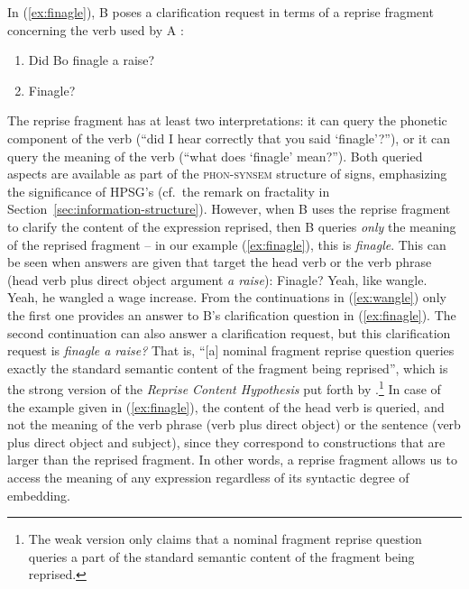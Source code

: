 \documentclass[output=paper,biblatex,babelshorthands,newtxmath,draftmode,colorlinks,citecolor=brown]{langscibook}
\begin{document}
In (\ref{ex:finagle}), B poses a clarification request in terms of a reprise fragment concerning the verb used by A \citep[]{Ginzburg:2012}:
%
\ea \label{ex:finagle}
\begin{enumerate}[noitemsep]
\item {} Did Bo finagle a raise?
\item {} Finagle?
\end{enumerate}
\z

\noindent
The reprise fragment has at least two interpretations: it can query the phonetic component of the verb (\enquote{did I hear correctly that you said \enquote{finagle}?}), or it can query the meaning of the verb (\enquote{what does \enquote{finagle} mean?}).
%
Both queried aspects are available as part of the \textsc{phon-synsem} structure of signs, emphasizing the significance of HPSG's  (cf.\ the remark on fractality in Section~\ref{sec:information-structure}).
%
However, when B uses the reprise fragment to clarify the content of the expression reprised, then B queries \emph{only} the meaning of the reprised fragment \citep{Purver:Ginzburg:2004,Ginzburg:Purver:2012} -- in our example (\ref{ex:finagle}), this is \textit{finagle}.
%
This can be seen when answers are given that target the head verb or the verb phrase (head verb plus direct object argument \textit{a raise}):
%
\ea \label{ex:wangle} Finagle?
 \ea Yeah, like wangle.
 \ex Yeah, he wangled a wage increase.
 \z 
\z
%
From the continuations in (\ref{ex:wangle}) only the first one provides an answer to B's clarification question in (\ref{ex:finagle}).
%
The second continuation can also answer a clarification request, but this clarification request is \textit{finagle a raise?}
%
That is, \enquote{[a] nominal fragment reprise question queries exactly the standard semantic content of the fragment being reprised}, which is the strong version of the \emph{Reprise Content Hypothesis} put forth by \citet[]{Purver:Ginzburg:2004}.\footnote{The weak version \citep[]{Purver:Ginzburg:2004} only claims that a nominal fragment reprise question queries a part of the standard semantic content of the fragment being reprised.}
%
In case of the example given in (\ref{ex:finagle}), the content of the head verb is queried, and not the meaning of the verb phrase (verb plus direct object) or the sentence (verb plus direct object and subject), since they correspond to constructions that are larger than the reprised fragment. 
%
In other words, a reprise fragment allows us to access the meaning of any expression regardless of its syntactic degree of embedding. 
\end{document}
